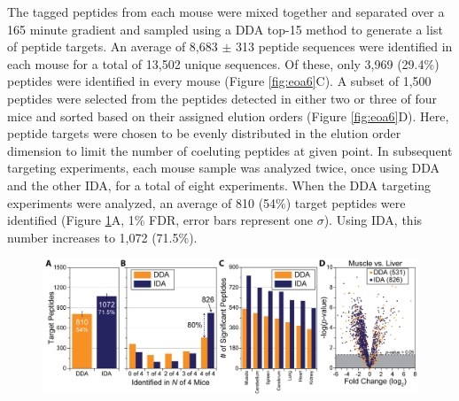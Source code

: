 The tagged peptides from each mouse were mixed together and separated over a 165 minute gradient and sampled using a DDA top-15 method to generate a list of peptide targets. An average of 8,683 $\pm$ 313 peptide sequences were identified in each mouse for a total of 13,502 unique sequences. Of these, only 3,969 (29.4\%) peptides were identified in every mouse (Figure \ref{fig:eoa6}C). A subset of 1,500 peptides were selected from the peptides detected in either two or three of four mice and sorted based on their assigned elution orders (Figure \ref{fig:eoa6}D). Here, peptide targets were chosen to be evenly distributed in the elution order dimension to limit the number of coeluting peptides at given point. In subsequent targeting experiments, each mouse sample was analyzed twice, once using DDA and the other IDA, for a total of eight experiments. When the DDA targeting experiments were analyzed, an average of 810 (54\%) target peptides were identified (Figure \ref{fig:eoa7}A, 1\% FDR, error bars represent one $\sigma$). Using IDA, this number increases to 1,072 (71.5\%).
\begin{figure}
	\centering
	\includegraphics[width=\columnwidth]{eoa/EOA 7.png}
	\label{fig:eoa7}
\end{figure}
